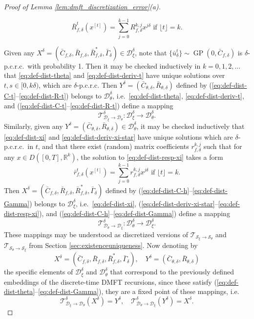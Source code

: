 \documentclass[11pt,letterpaper,reqno]{amsart}
\theoremstyle{definition}
\def\R{\mathbb{R}}
\def\GP{\operatorname{GP}}
\def\cD{\mathcal{D}}
\def\trsfrmA{\mathcal{T}_{\mathcal{S}_\xi \to {\mathcal{S}}_\theta}}
\def\trsfrmB{\mathcal{T}_{{\mathcal{S}}_\theta \to \mathcal{S}_\xi}}
\def\trsfrmDA{\mathcal{T}^\delta_{\mathcal{D}_\xi \to {\mathcal{D}}_\theta}}
\def\trsfrmDB{\mathcal{T}^\delta_{{\mathcal{D}}_\theta \to \mathcal{D}_\xi}}
\newcommand{\flr}[1]{{\lfloor {#1} \rfloor}}
\begin{document}
\begin{proof}[Proof of Lemma \ref{lem:dmft_discretization_error}(a)]
\begin{itemize}
\begin{equation}\label{eq:barRform}
\bar R_{f,\delta}^t(x^{[t]})=
\sum_{j=0}^{k-1} R_{f,\delta}^{k,j}x^{j\delta} \text{ if } \flr{t}=k.
\end{equation}
\end{itemize}
Given any $X^\delta=(\bar C_{f,\delta},\bar R_{f,\delta},
\bar R_{f,\delta}^*,\bar \Gamma_\delta) \in \cD_\xi^\delta$, note that
$\{\bar u_\delta^t\} \sim \GP(0,\bar C_{f,\delta})$ is $\delta$-p.c.r.c.\ with
probability 1. Then it may be checked inductively in $k=0,1,2,\ldots$ that 
\eqref{eq:def-dist-theta} and \eqref{eq:def-dist-deriv-t} have
unique solutions over $t,s \in [0,k\delta)$, which are $\delta$-p.c.r.c. Then
$Y^\delta=(\bar C_{\theta,\delta},\bar R_{\theta,\delta})$ defined by
(\ref{eq:def-dist-C-t}--\ref{eq:def-dist-R-t}) belongs to $\cD_\theta^\delta$,
i.e.\ \eqref{eq:def-dist-theta}, \eqref{eq:def-dist-deriv-t}, and 
(\ref{eq:def-dist-C-t}--\ref{eq:def-dist-R-t}) define a mapping
\[\trsfrmDA:\cD_\xi^\delta \to \cD_\theta^\delta.\]
Similarly, given any
$Y^\delta=(\bar C_{\theta,\delta},\bar R_{\theta,\delta})
\in \cD_\theta^\delta$, it may be checked inductively that 
\eqref{eq:def-dist-xi} and \eqref{eq:def-dist-deriv-xi-star} have unique
solutions which are $\delta$-p.c.r.c.\ in $t$, and that there exist (random)
matrix coefficients $r_{f,\delta}^{k,j}$ such that for any
$x \in D([0,T],\R^k)$, the solution to \eqref{eq:def-dist-resp-xi} takes a form
\[\bar r_{f,\delta}^t(x^{[t]})
=\sum_{j=0}^{k-1} r_{f,\delta}^{k,j}x^{j\delta}
\text{ if } \flr{t}=k.\]
Then $X^\delta=(\bar C_{f,\delta},\bar R_{f,\delta},
\bar R_{f,\delta}^*,\bar \Gamma_\delta)$ defined by
(\ref{eq:def-dist-C-h}--\ref{eq:def-dist-Gamma}) belongs to $\cD_\xi^\delta$,
i.e.\ \eqref{eq:def-dist-xi},
(\ref{eq:def-dist-deriv-xi-star}--\ref{eq:def-dist-resp-xi}), and
(\ref{eq:def-dist-C-h}--\ref{eq:def-dist-Gamma}) define a mapping
\[\trsfrmDB:\cD_\theta^\delta \to \cD_\xi^\delta.\]
These mappings may be understood as
discretized versions of $\trsfrmA$ and $\trsfrmB$ from Section
\ref{sec:existenceuniqueness}. Now denoting by
\[X^\delta=(\bar C_{f,\delta},\bar R_{f,\delta},
\bar R_{f,\delta}^*,\bar \Gamma_\delta),
\quad Y^\delta=(\bar C_{\theta,\delta},\bar R_{\theta,\delta})\]
the specific elements of $\cD_\xi^\delta$ and $\cD_\theta^\delta$ that
correspond to the previously defined embeddings of the discrete-time DMFT
recursions,
since these satisfy (\ref{eq:def-dist-theta}--\ref{eq:def-dist-Gamma}), they
are a fixed point of these mappings, i.e.
\[\trsfrmDA(X^\delta)=Y^\delta,
\quad \trsfrmDB(Y^\delta)=X^\delta.\]


\end{proof}
\end{document}
